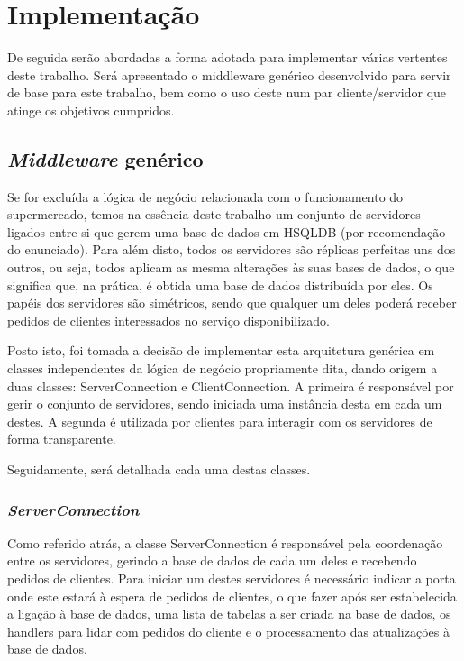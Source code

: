 \documentclass[a4paper]{report}
\begin{document}
\chapter{Implementação} \label{ch:Implementation}
\large{
	De seguida serão abordadas a forma adotada para implementar várias vertentes deste trabalho. Será apresentado o middleware genérico desenvolvido para servir de base para este trabalho, bem como o uso deste num par cliente/servidor que atinge os objetivos cumpridos.

	\section{\textit{Middleware} genérico} \label{sec:Middleware}
		Se for excluída a lógica de negócio relacionada com o funcionamento do supermercado, temos na essência deste trabalho um conjunto de servidores ligados entre si que gerem uma base de dados em HSQLDB (por recomendação do enunciado). Para além disto, todos os servidores são réplicas perfeitas uns dos outros, ou seja, todos aplicam as mesma alterações às suas bases de dados, o que significa que, na prática, é obtida uma base de dados distribuída por eles. Os papéis dos servidores são simétricos, sendo que qualquer um deles poderá receber pedidos de clientes interessados no serviço disponibilizado.

		Posto isto, foi tomada a decisão de implementar esta arquitetura genérica em classes independentes da lógica de negócio propriamente dita, dando origem a duas classes: ServerConnection e ClientConnection. A primeira é responsável por gerir o conjunto de servidores, sendo iniciada uma instância desta em cada um destes. A segunda é utilizada por clientes para interagir com os servidores de forma transparente.

		Seguidamente, será detalhada cada uma destas classes.

		\subsection{\textit{ServerConnection}} \label{subsec:ServerConnection}
			Como referido atrás, a classe ServerConnection é responsável pela coordenação entre os servidores, gerindo a base de dados de cada um deles e recebendo pedidos de clientes. Para iniciar um destes servidores é necessário indicar a porta onde este estará à espera de pedidos de clientes, o que fazer após ser estabelecida a ligação à base de dados, uma lista de tabelas a ser criada na base de dados, os handlers para lidar com pedidos do cliente e o processamento das atualizações à base de dados.
			
}
\end{document}
